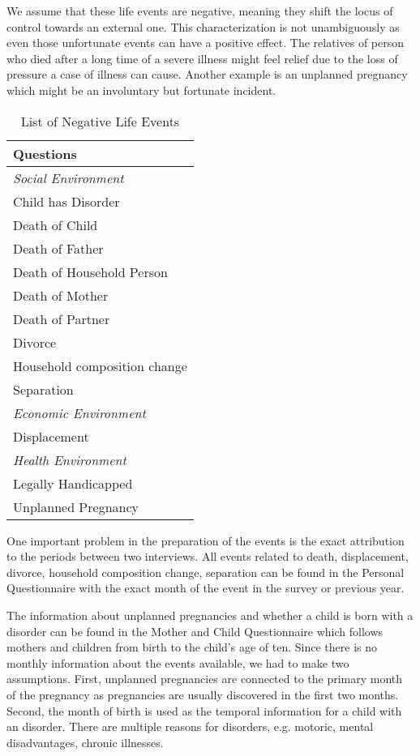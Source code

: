 \documentclass[12pt, a4paper, fleqn, parskip]{scrartcl}
\newcommand{\rowgroup}[1]{\hspace{-1em}#1}  %
\begin{document}
We assume that these life events are negative, meaning they shift the locus of
control towards an external one. This characterization is not unambiguously as
even those unfortunate events can have a positive effect. The relatives of
person who died after a long time of a severe illness might feel relief due to
the loss of pressure a case of illness can cause. Another example is an
unplanned pregnancy which might be an involuntary but fortunate incident.

\begin{table}[H]
    \caption{List of Negative Life Events}
    \label{tab:negative_life_events}
    \centering

    \begin{tabular}{>{\quad}l}
    \toprule
    Questions\\
    \midrule
    \rule{0pt}{2.5ex}\rowgroup{\textit{Social Environment}} \\
    Child has Disorder\\
    Death of Child\\
    Death of Father\\
    Death of Household Person\\
    Death of Mother\\
    Death of Partner\\
    Divorce\\
    Household composition change\\
    Separation\\
    \rule{0pt}{2.5ex}\rowgroup{\textit{Economic Environment}} \\
    Displacement\\
    \rule{0pt}{2.5ex}\rowgroup{\textit{Health Environment}} \\
    Legally Handicapped\\
    Unplanned Pregnancy\\
    \bottomrule
    \end{tabular}
\end{table}

One important problem in the preparation of the events is the exact attribution
to the periods between two interviews. All events related to death,
displacement, divorce, household composition change, separation can be found in
the Personal Questionnaire with the exact month of the event in the survey or
previous year.

The information about unplanned pregnancies and whether a child is born with a
disorder can be found in the Mother and Child Questionnaire which follows
mothers and children from birth to the child's age of ten. Since there is no
monthly information about the events available, we had to make two assumptions.
First, unplanned pregnancies are connected to the primary month of the
pregnancy as pregnancies are usually discovered in the first two months.
Second, the month of birth is used as the temporal information for a child with
an disorder. There are multiple reasons for disorders, e.g. motoric, mental
disadvantages, chronic illnesses.
\end{document}
